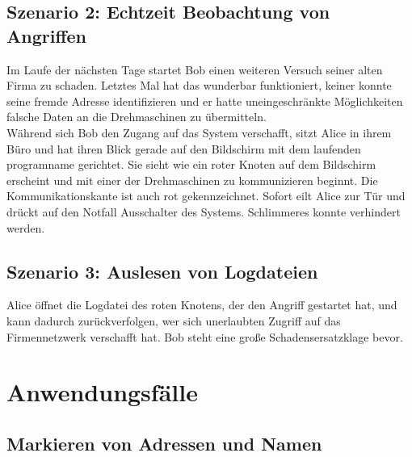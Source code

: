 \subsection{Szenario 2: Echtzeit Beobachtung von Angriffen}

Im Laufe der nächsten Tage startet Bob einen weiteren Versuch seiner alten Firma zu schaden. Letztes Mal hat das wunderbar funktioniert, keiner konnte seine fremde Adresse identifizieren und er hatte uneingeschränkte Möglichkeiten falsche Daten an die Drehmaschinen zu übermitteln.\\
Während sich Bob den Zugang auf das System verschafft, sitzt Alice in ihrem Büro und hat ihren Blick gerade auf den Bildschirm mit dem laufenden \gls{programname} gerichtet. Sie sieht wie ein roter Knoten auf dem Bildschirm erscheint und mit einer der Drehmaschinen zu kommunizieren beginnt. Die Kommunikationskante ist auch rot gekennzeichnet. Sofort eilt Alice zur Tür und drückt auf den Notfall Ausschalter des Systems. Schlimmeres konnte verhindert werden.

\subsection{Szenario 3: Auslesen von Logdateien}

Alice öffnet die Logdatei des roten Knotens, der den Angriff gestartet hat, und kann dadurch zurückverfolgen, wer sich unerlaubten Zugriff auf das Firmennetzwerk verschafft hat. Bob steht eine große Schadensersatzklage bevor.


\section{Anwendungsfälle}

\subsection{Markieren von Adressen und Namen}

